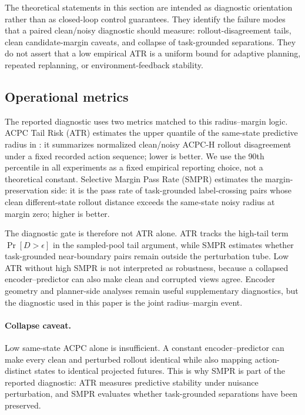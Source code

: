 \documentclass[10pt]{article}
\begin{document}
The theoretical statements in this section are intended as diagnostic orientation rather than as closed-loop control guarantees. They identify the failure modes that a paired clean/noisy diagnostic should measure: rollout-disagreement tails, clean candidate-margin caveats, and collapse of task-grounded separations. They do not assert that a low empirical ATR is a uniform bound for adaptive planning, repeated replanning, or environment-feedback stability.

\subsection{Operational metrics}\label{sec:acpc-diag}

The reported diagnostic uses two metrics matched to this radius--margin logic. ACPC Tail Risk (ATR) estimates the upper quantile of the same-state predictive radius in : it summarizes normalized clean/noisy ACPC-H rollout disagreement under a fixed recorded action sequence; lower is better. We use the 90th percentile in all experiments as a fixed empirical reporting choice, not a theoretical constant. Selective Margin Pass Rate (SMPR) estimates the margin-preservation side: it is the pass rate of task-grounded label-crossing pairs whose clean different-state rollout distance exceeds the same-state noisy radius at margin zero; higher is better.

The diagnostic gate is therefore not ATR alone. ATR tracks the high-tail term $\Pr[D > \epsilon]$ in the sampled-pool tail argument, while SMPR estimates whether task-grounded near-boundary pairs remain outside the perturbation tube. Low ATR without high SMPR is not interpreted as robustness, because a collapsed encoder--predictor can also make clean and corrupted views agree. Encoder geometry and planner-side analyses remain useful supplementary diagnostics, but the diagnostic used in this paper is the joint radius--margin event.


\paragraph{Collapse caveat.}
Low same-state ACPC alone is insufficient. A constant encoder--predictor can make every clean and perturbed rollout identical while also mapping action-distinct states to identical projected futures. This is why SMPR is part of the reported diagnostic: ATR measures predictive stability under nuisance perturbation, and SMPR evaluates whether task-grounded separations have been preserved.
\end{document}
